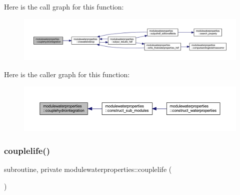 Here is the call graph for this function\+:\nopagebreak
\begin{figure}[H]
\begin{center}
\leavevmode
\includegraphics[width=350pt]{namespacemodulewaterproperties_a52ab6cc6910ba77bfa6154aca1f67db0_cgraph}
\end{center}
\end{figure}
Here is the caller graph for this function\+:\nopagebreak
\begin{figure}[H]
\begin{center}
\leavevmode
\includegraphics[width=350pt]{namespacemodulewaterproperties_a52ab6cc6910ba77bfa6154aca1f67db0_icgraph}
\end{center}
\end{figure}
\mbox{\label{namespacemodulewaterproperties_a2568e97ada2e06111796b52ea4b7c50a}} 
\subsubsection{\texorpdfstring{couplelife()}{couplelife()}}
{\footnotesize\ttfamily subroutine, private modulewaterproperties\+::couplelife (\begin{DoxyParamCaption}{ }\end{DoxyParamCaption})\hspace{0.3cm}{\ttfamily [private]}}

